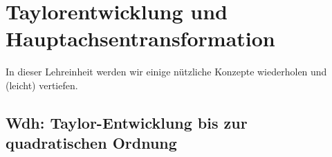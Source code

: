 

\section{Taylorentwicklung und Hauptachsentransformation}


In dieser Lehreinheit werden wir einige n\"utzliche 
Konzepte wiederholen und (leicht) vertiefen.


\subsection{Wdh: Taylor-Entwicklung bis zur quadratischen Ordnung}

